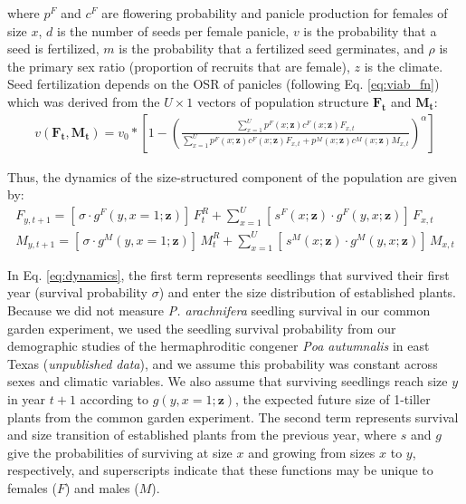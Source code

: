 \documentclass[11pt]{article}\usepackage[]{graphicx}\usepackage[usenames,dvipsnames]{xcolor}
\begin{document}
\noindent where $p^{F}$ and $c^{F}$ are flowering probability and panicle production for females of size $x$, $d$ is the number of seeds per female panicle, $v$ is the probability that a seed is fertilized, $m$ is the probability that a fertilized seed germinates, and $\rho$ is the primary sex ratio (proportion of recruits that are female), $z$ is the climate. 
Seed fertilization depends on the OSR of panicles (following Eq. \ref{eq:viab_fn}) which was derived from the $U \times 1$ vectors of population structure $\mathbf{F_{t}}$ and $\mathbf{M_{t}}$:
\begin{align}\label{eq:viab_MPM}
v(\mathbf{F_{t}},\mathbf{M_{t}}) = v_{0} * \left[ 1 - \left( \frac{\sum_{x=1}^{U} p^{F}(x;\mathbf{z}) c^{F}(x;\mathbf{z}) F_{x,t}}{\sum_{x=1}^{U} p^{F}(x;\mathbf{z}) c^{F}(x;\mathbf{z}) F_{x,t} + p^{M}(x;\mathbf{z}) c^{M}(x;\mathbf{z}) M_{x,t}} \right) ^{\alpha}\right]
\end{align}

Thus, the dynamics of the size-structured component of the population are given by:
\begin{align}\label{eq:dynamics}
F_{y,t+1} = [ \, \sigma \cdot g^{F}(y,x=1;\mathbf{z}) ] \, F^{R}_{t} + \sum_{x=1}^{U} 	[ \, s^{F}(x;\mathbf{z}) \cdot g^{F}(y,x;\mathbf{z})] \, F_{x,t}
\\
M_{y,t+1} = [ \, \sigma \cdot g^{M}(y,x=1;\mathbf{z}) ] \, M^{R}_{t} + \sum_{x=1}^{U} 	[ \,  s^{M}(x;\mathbf{z}) \cdot g^{M}(y,x;\mathbf{z}) ] \, M_{x,t}
\end{align}

\noindent In Eq. \ref{eq:dynamics}, the first term represents seedlings that survived their first year (survival probability $\sigma$) and enter the size distribution of established plants.
Because we did not measure \textit{P. arachnifera} seedling survival in our common garden experiment, we used the seedling survival probability from our demographic studies of the hermaphroditic congener \textit{Poa autumnalis} in east Texas (\textit{unpublished data}), and we assume this probability was constant across sexes and climatic variables. 
We also assume that surviving seedlings reach size $y$ in year $t+1$ according to $g(y,x=1;\mathbf{z})$, the expected future size of 1-tiller plants from the common garden experiment.
The second term represents survival and size transition of established plants from the previous year, where $s$ and $g$ give the probabilities of surviving at size $x$ and growing from sizes $x$ to $y$, respectively, and superscripts indicate that these functions may be unique to females ($F$) and males ($M$).
\end{document}
